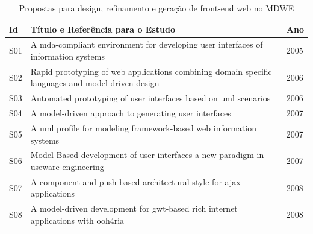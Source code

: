 \begin{table}[ht!]
\tiny
  \caption{Propostas para design, refinamento e geração de front-end web no MDWE} %

\begin{tabular}{ | p{0.3cm} | p{6.2cm} | p{0.7cm}|}
   \hline

     \textbf{Id}
    & \textbf{Título e Referência para o Estudo}
        & \textbf{Ano}
		\\ \hline
		

		
S01 &  A mda-compliant environment for developing user interfaces of information systems~\cite{Vanderdonckt05} & 2005 \\ \hline

S02 &  Rapid prototyping of web applications combining domain specific languages and model driven design~\cite{Nunes06}  &  2006 \\ \hline

S03 &  Automated prototyping of user interfaces based on uml scenarios~\cite{Elkoutbi06}  & 2006 \\ \hline

S04 &  A model-driven approach to generating user interfaces~\cite{Kavaldjian07}  & 2007 \\ \hline

S05 & A uml profile for modeling framework-based web information systems~\cite{Souza07}  &   2007 \\ \hline

S06 &  Model-Based development of user interfaces a new paradigm in useware engineering~\cite{ZUEHLKE200731}  &  2007 \\ \hline		

S07 &  A component-and push-based architectural style for ajax applications~\cite{mesbah2008component}  & 2008\\ \hline

S08 &  A model-driven development for gwt-based rich internet applications with ooh4ria~\cite{Melia08}  &  2008 \\ \hline


\end{tabular}
\end{table}
